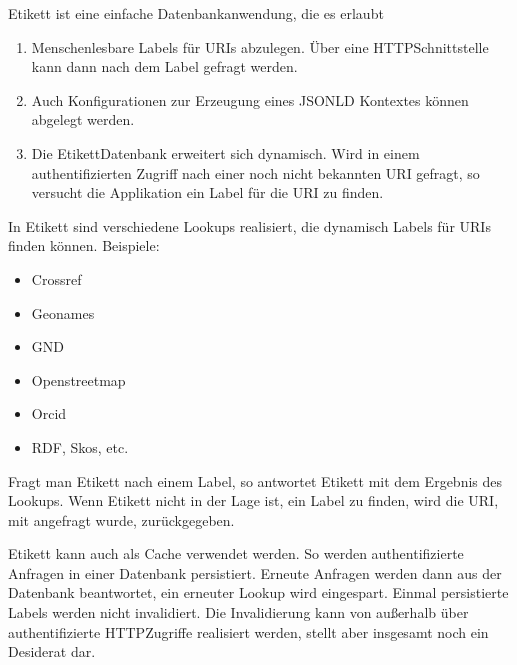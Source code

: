 \documentclass[letterpaper,10pt,english]{sphinxmanual}
\begin{document}
\sphinxAtStartPar
Etikett ist eine einfache Datenbankanwendung, die es erlaubt
\begin{enumerate}
%
\item {} 
\sphinxAtStartPar
Menschenlesbare Labels für URIs abzulegen. Über eine
HTTP\sphinxhyphen{}Schnittstelle kann dann nach dem Label gefragt werden.

\item {} 
\sphinxAtStartPar
Auch Konfigurationen zur Erzeugung eines JSON\sphinxhyphen{}LD Kontextes können
abgelegt werden.

\item {} 
\sphinxAtStartPar
Die Etikett\sphinxhyphen{}Datenbank erweitert sich dynamisch. Wird in einem
authentifizierten Zugriff nach einer noch nicht bekannten URI
gefragt, so versucht die Applikation ein Label für die URI zu finden.

\end{enumerate}

\sphinxAtStartPar
In Etikett sind verschiedene Lookups realisiert, die dynamisch Labels
für URIs finden können. Beispiele:
\begin{itemize}
\item {} 
\sphinxAtStartPar
Crossref

\item {} 
\sphinxAtStartPar
Geonames

\item {} 
\sphinxAtStartPar
GND

\item {} 
\sphinxAtStartPar
Openstreetmap

\item {} 
\sphinxAtStartPar
Orcid

\item {} 
\sphinxAtStartPar
RDF, Skos, etc.

\end{itemize}

\sphinxAtStartPar
Fragt man Etikett nach einem Label, so antwortet Etikett mit dem
Ergebnis des Lookups. Wenn Etikett nicht in der Lage ist, ein Label zu
finden, wird die URI, mit angefragt wurde, zurückgegeben.

\sphinxAtStartPar
Etikett kann auch als Cache verwendet werden. So werden authentifizierte
Anfragen in einer Datenbank persistiert. Erneute Anfragen werden dann
aus der Datenbank beantwortet, ein erneuter Lookup wird eingespart.
Einmal persistierte Labels werden nicht invalidiert. Die Invalidierung
kann von außerhalb über authentifizierte HTTP\sphinxhyphen{}Zugriffe realisiert
werden, stellt aber insgesamt noch ein Desiderat dar.
\end{document}
